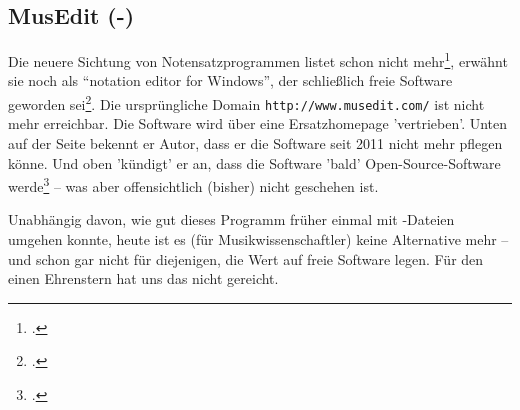 %
%
%




\subsection{MusEdit (-)}

\label{MusEdit}Die neuere Sichtung von Notensatzprogrammen listet 
schon nicht mehr\footcite[vgl.][\nopage wp]{WpedNotensatz2019a}, 
erwähnt sie noch als \enquote{notation editor for Windows}, der schließlich
freie Software geworden sei\footcite[vgl.][\nopage wp]{MusicXML2018b}. Die
ursprüngliche Domain \texttt{http://www.musedit.com/} ist nicht mehr erreichbar.
Die Software wird über eine Ersatzhomepage 'vertrieben'. Unten auf der Seite
bekennt er Autor, dass er die Software seit 2011 nicht mehr pflegen könne. Und
oben 'kündigt' er an, dass die Software 'bald' Open-Source-Software
werde\footcite[vgl.][\nopage wp]{Rogers2011a} -- was aber offensichtlich
(bisher) nicht geschehen ist.

Unabhängig davon, wie gut dieses Programm früher einmal mit
-Dateien umgehen konnte, heute ist es (für Musikwissenschaftler)
keine Alternative mehr -- und schon gar nicht für diejenigen, die Wert auf freie
Software legen. Für den einen Ehrenstern hat uns das nicht gereicht.

%
